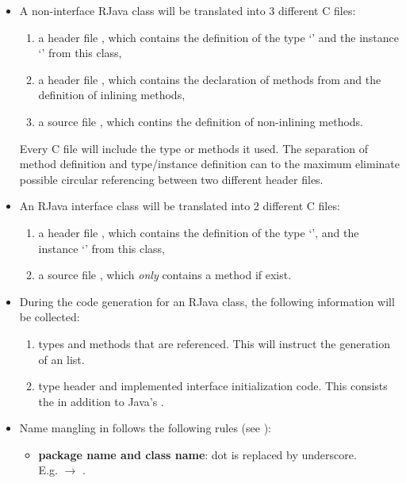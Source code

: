 \documentclass[12pt]{article}
\begin{document}
\begin{itemize}
\item A non-interface RJava class 
will be translated into 3 different 
C files:
  \begin{enumerate}
  \item a header file ,
  which contains the definition of the type `'
  and the instance `' from this class,
  \item a header file ,
  which contains the declaration of methods from 
  and the definition of inlining methods,
  \item a source file ,
  which contins the definition of non-inlining methods. 
  \end{enumerate}
Every C file will include the type or methods it used. 
The separation of method definition and type/instance definition 
can to the maximum eliminate possible circular referencing between
two different header files. 

\item An RJava interface class 
will be translated into 2 different C files:
  \begin{enumerate}
  \item a header file ,
  which contains the definition of the type `',
  and the instance `' from this class,
  \item a source file ,
  which \emph{only} contains a  method if exist. 
  \end{enumerate}

\item During the code generation for an RJava class, 
the following information will be collected:
  \begin{enumerate}
  \item types and methods that are referenced. This will instruct the generation of 
  an  list.
  \item type header and implemented interface initialization code. 
  This consists the  in
  addition to Java's .
  \end{enumerate}

\item Name mangling in \rjc follows the following rules (see ):
  \begin{itemize}
  \item \textbf{package name and class name}: dot is replaced by underscore. 
  \\E.g.  $\rightarrow$ .
  

\end{itemize}
\end{itemize}
\end{document}
